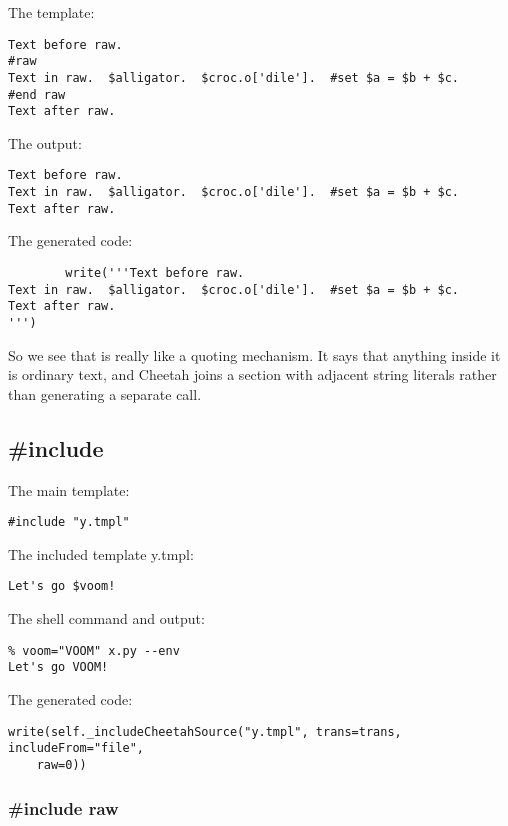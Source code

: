 The template:
\begin{verbatim}
Text before raw.
#raw
Text in raw.  $alligator.  $croc.o['dile'].  #set $a = $b + $c.
#end raw
Text after raw.
\end{verbatim}

The output:
\begin{verbatim}
Text before raw.
Text in raw.  $alligator.  $croc.o['dile'].  #set $a = $b + $c.
Text after raw.
\end{verbatim}

The generated code:
\begin{verbatim}
        write('''Text before raw.
Text in raw.  $alligator.  $croc.o['dile'].  #set $a = $b + $c.
Text after raw.
''')
\end{verbatim}

So we see that  is really like a quoting mechanism.  It says that
anything inside it is ordinary text, and Cheetah joins a  section 
with adjacent string literals rather than generating a separate 
call.

\subsection{\#include}
\label{output.include}

The main template:
\begin{verbatim}
#include "y.tmpl"
\end{verbatim}

The included template y.tmpl:
\begin{verbatim}
Let's go $voom!
\end{verbatim}

The shell command and output:
\begin{verbatim}
% voom="VOOM" x.py --env
Let's go VOOM!
\end{verbatim}

The generated code:
\begin{verbatim}
write(self._includeCheetahSource("y.tmpl", trans=trans, includeFrom="file",
    raw=0))
\end{verbatim}

\subsubsection{\#include raw}
\label{output.include.raw}

